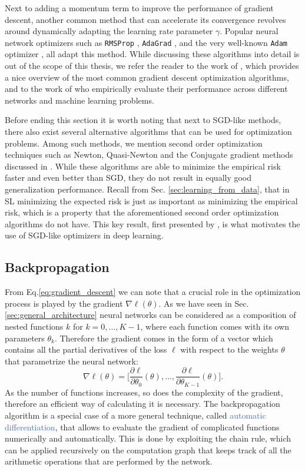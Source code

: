 Next to adding a momentum term to improve the performance of gradient descent, another common method that can accelerate its convergence revolves around dynamically adapting the learning rate parameter $\gamma$. Popular neural network optimizers such as \texttt{RMSProp} \cite{tieleman2012lecture}, \texttt{AdaGrad} \cite{duchi2011adaptive}, and the very well-known \texttt{Adam} optimizer \cite{kingma2014adam}, all adapt this method. While discussing these algorithms into detail is out of the scope of this thesis, we refer the reader to the work of \citet{ruder2016overview}, which provides a nice overview of the most common gradient descent optimization algorithms, and to the work of \citet{schmidt2020descending} who empirically evaluate their performance across different networks and machine learning problems. 

Before ending this section it is worth noting that next to SGD-like methods, there also exist several alternative algorithms that can be used for optimization problems. Among such methods, we mention second order optimization techniques such as Newton, Quasi-Newton and the Conjugate gradient methods discussed in \cite{tan2019review}. While these algorithms are able to minimize the empirical risk faster and even better than SGD, they do not result in equally good generalization performance. Recall from Sec. \ref{sec:learning_from_data}, that in SL minimizing the expected risk is just as important as minimizing the empirical risk, which is a property that the aforementioned second order optimization algorithms do not have. This key result, first presented by \citet{bottou201113}, is what motivates the use of SGD-like optimizers in deep learning.       

\subsection{Backpropagation}
\label{sec:backprop}

From Eq.\ref{eq:gradient_descent} we can note that a crucial role in the optimization process is played by the gradient $\nabla\ell(\theta)$. As we have seen in Sec. \ref{sec:general_architecture} neural networks can be considered as a composition of nested functions $k$ for $k=0,...,K-1$, where each function comes with its own parameters $\theta_k$. Therefore the gradient comes in the form of a vector which contains all the partial derivatives of the loss $\ell$ with respect to the weights $\theta$ that parametrize the neural network:
\begin{equation}
	\nabla\ell(\theta) = \Big[\frac{\partial\ell}{\partial\theta_0}(\theta),...,\frac{\partial\ell}{\partial\theta_{K-1}}(\theta)\Big].
\end{equation}
As the number of functions increases, so does the complexity of the gradient, therefore an efficient way of calculating it is necessary. The backpropagation algorithm is a special case of a more general technique, called \textcolor{RoyalBlue}{automatic differentiation}, that allows to evaluate the gradient of complicated functions numerically and automatically. This is done by exploiting the chain rule, which can be applied recursively on the computation graph that keeps track of all the arithmetic operations that are performed by the network. 

